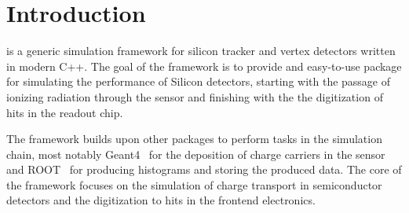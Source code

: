 \section{Introduction}
\label{sec:introduction}
\apsq is a generic simulation framework for silicon tracker and vertex detectors written in modern C++.
The goal of the \apsq framework is to provide and easy-to-use package for simulating the performance of Silicon detectors, starting with the passage of ionizing radiation through the sensor and finishing with the the digitization of hits in the readout chip.

The framework builds upon other packages to perform tasks in the simulation chain, most notably Geant4~\cite{geant4} for the deposition of charge carriers in the sensor and ROOT~\cite{root} for producing histograms and storing the produced data.
The core of the framework focuses on the simulation of charge transport in semiconductor detectors and the digitization to hits in the frontend electronics.

